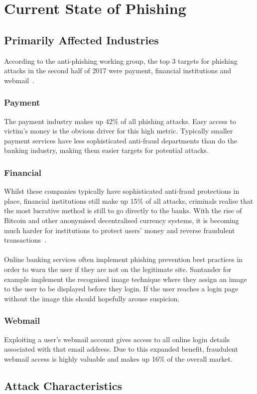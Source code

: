 \documentclass[12pt,twoside]{report}
\begin{document}
\chapter{Current State of Phishing}
\section{Primarily Affected Industries}
According to the anti-phishing working group, the top 3 targets for phishing attacks in the second half of 2017 were payment, financial institutions and webmail~\cite{apwg}.
\subsection{Payment}
The payment industry makes up 42\% of all phishing attacks. Easy access to victim’s money is the obvious driver for this high metric. Typically smaller payment services have less sophisticated anti-fraud departments than do the banking industry, making them easier targets for potential attacks.
\subsection{Financial}
Whilst these companies typically have sophisticated anti-fraud protections in place, financial institutions still make up 15\% of all attacks, criminals realise that the most lucrative method is still to go directly to the banks. With the rise of Bitcoin and other anonymised decentralised currency systems, it is becoming much harder for institutions to protect users’ money and reverse fraudulent transactions~\cite{bitcoin}.
\\\\
Online banking services often implement phishing prevention best practices in order to warn the user if they are not on the legitimate site. Santander for example implement the recognised image technique where they assign an image to the user to be displayed before they login. If the user reaches a login page without the image this should hopefully arouse suspicion. 
\subsection{Webmail}
Exploiting a user's webmail account gives access to all online login details associated with that email address. Due to this expanded benefit, fraudulent webmail access is highly valuable and makes up 16\% of the overall market.
\section{Attack Characteristics}
\end{document}
